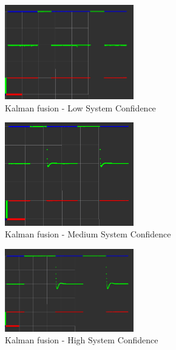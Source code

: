 \begin{figure}[thpb]
      \centering
      \includegraphics[width=0.5\textwidth]{graphics/kalman_fast.png}
      \caption{Kalman fusion - Low System Confidence}
      \label{Fig: Kalman Fusion - Low}
   \end{figure}

\begin{figure}[thpb]
      \centering
      \includegraphics[width=0.5\textwidth]{graphics/kalman_medium.png}
      \caption{Kalman fusion - Medium System Confidence}
      \label{Fig: Kalman Fusion - Medium}
   \end{figure}
	
\begin{figure}[thpb]
      \centering
      \includegraphics[width=0.5\textwidth]{graphics/kalman_slow.png}
      \caption{Kalman fusion - High System Confidence}
      \label{Fig: Kalman Fusion - High}
   \end{figure}

